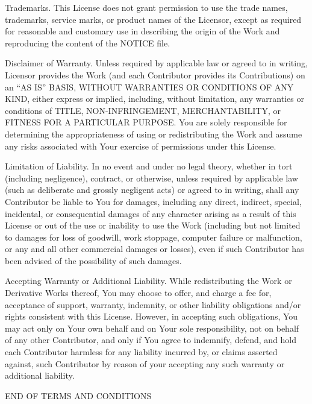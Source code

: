 \documentclass{article}
\begin{document}
  Trademarks. This License does not grant permission to use the trade
  names, trademarks, service marks, or product names of the Licensor,
  except as required for reasonable and customary use in describing
  the origin of the Work and reproducing the content of the NOTICE
  file.

  Disclaimer of Warranty. Unless required by applicable law or agreed
  to in writing, Licensor provides the Work (and each Contributor
  provides its Contributions) on an ``AS IS'' BASIS, WITHOUT
  WARRANTIES OR CONDITIONS OF ANY KIND, either express or implied,
  including, without limitation, any warranties or conditions of
  TITLE, NON-INFRINGEMENT, MERCHANTABILITY, or FITNESS FOR A
  PARTICULAR PURPOSE. You are solely responsible for determining the
  appropriateness of using or redistributing the Work and assume any
  risks associated with Your exercise of permissions under this
  License.

  Limitation of Liability. In no event and under no legal theory,
  whether in tort (including negligence), contract, or otherwise,
  unless required by applicable law (such as deliberate and grossly
  negligent acts) or agreed to in writing, shall any Contributor be
  liable to You for damages, including any direct, indirect, special,
  incidental, or consequential damages of any character arising as a
  result of this License or out of the use or inability to use the
  Work (including but not limited to damages for loss of goodwill,
  work stoppage, computer failure or malfunction, or any and all
  other commercial damages or losses), even if such Contributor has
  been advised of the possibility of such damages.

  Accepting Warranty or Additional Liability. While redistributing
  the Work or Derivative Works thereof, You may choose to offer, and
  charge a fee for, acceptance of support, warranty, indemnity, or
  other liability obligations and/or rights consistent with this
  License. However, in accepting such obligations, You may act only
  on Your own behalf and on Your sole responsibility, not on behalf
  of any other Contributor, and only if You agree to indemnify,
  defend, and hold each Contributor harmless for any liability
  incurred by, or claims asserted against, such Contributor by reason
  of your accepting any such warranty or additional liability.

END OF TERMS AND CONDITIONS
\end{document}

